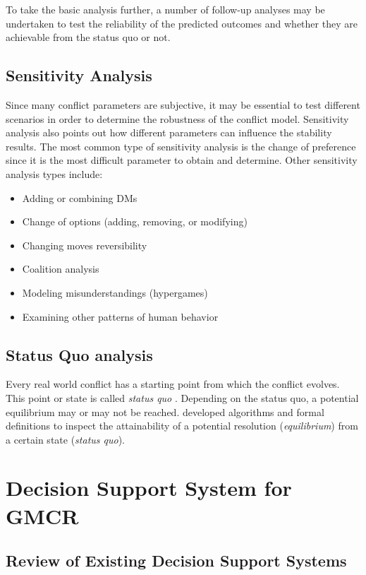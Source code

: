 \documentclass[letterpaper,12pt,titlepage,oneside,final]{book}
\begin{document}
To take the basic analysis further, a number of follow-up analyses may be undertaken to test the reliability of the predicted outcomes and whether they are achievable from the status quo or not.

\subsection{Sensitivity Analysis}

Since many conflict parameters are subjective, it may be essential to test different scenarios in order to determine the robustness of the conflict model. Sensitivity analysis also points out how different parameters can influence the stability results. The most common type of sensitivity analysis is the change of preference since it is the most difficult parameter to obtain and determine. Other sensitivity analysis types include:

\begin{itemize}
\item Adding or combining DMs
\item Change of options (adding, removing, or modifying) 
\item Changing moves reversibility
\item Coalition analysis
\item Modeling misunderstandings (hypergames)
\item Examining other patterns of human behavior
\end{itemize}


\subsection{Status Quo analysis}

Every real world conflict has a starting point from which the conflict evolves. This point or state is called \emph{status quo} \citep{fang1993}. Depending on the status quo, a potential equilibrium may or may not be reached. \citet{li2004squo,li2005squo} developed algorithms and formal definitions to inspect the attainability of a potential resolution (\emph{equilibrium}) from a certain state (\emph{status quo}).

\section{Decision Support System for GMCR}

\subsection{Review of Existing Decision Support Systems}
\end{document}
